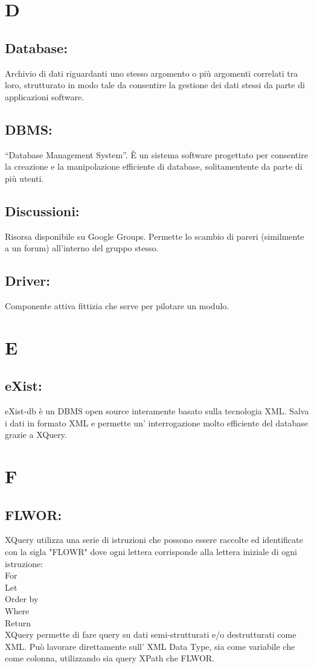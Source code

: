 \documentclass[11pt,titlepage,a4paper]{report}
\begin{document}
\chapter{D}
\section{Database:}
Archivio di dati riguardanti uno stesso argomento o pi\`u argomenti correlati tra loro, strutturato in modo tale da consentire la gestione dei dati stessi da parte di applicazioni software.
\section{DBMS:}
``Database Management System''. \`E un sistema software progettato per consentire la creazione e la manipolazione efficiente di database, solitamentente da parte di pi\`u utenti.
\section{Discussioni:}
Risorsa disponibile su Google Groups. Permette lo scambio di pareri (similmente a un forum) all'interno del gruppo stesso.
\section{Driver:}
Componente attiva fittizia che serve per pilotare un modulo.

\chapter{E}
\section{eXist:}
eXist-db \`e un DBMS open source interamente basato sulla tecnologia XML. Salva i dati in formato XML e permette un' interrogazione molto efficiente del database grazie a XQuery.

\chapter{F}
\section{FLWOR:}
XQuery utilizza una serie di istruzioni che possono essere raccolte ed identificate con la sigla "FLOWR" dove ogni lettera corrisponde alla lettera iniziale di ogni istruzione:\\
For \\
Let \\
Order by \\
Where \\
Return \\
XQuery permette di fare query su dati semi-strutturati e/o destrutturati come XML. Pu\`o lavorare direttamente sull' XML Data Type, sia come variabile che come colonna, utilizzando sia query XPath che FLWOR.
\end{document}
